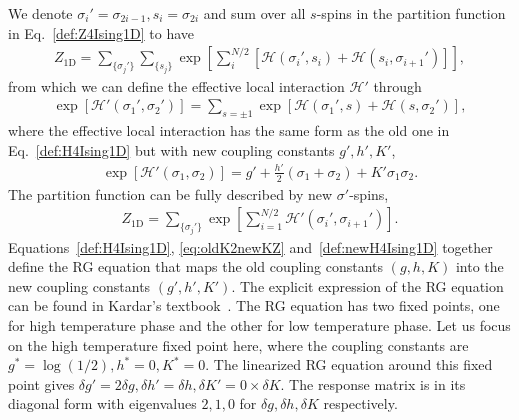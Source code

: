 \documentclass[aps,prb,reprint,superscriptaddress]{revtex4-2}
\begin{document}
We denote $\sigma_i'=\sigma_{2i-1}, s_i = \sigma_{2i}$ and sum over all
$s$-spins in the partition function in Eq.~\eqref{def:Z4Ising1D} to have
%
\begin{align}\label{eq:oldK2newKZ}
    Z_{\text{1D}} = \sum_{\{\sigma_j'\}} \sum_{\{s_j \}}
    \exp{\left[ \sum_i^{N/2} \left[\mathscr{H}\left(\sigma_i',s_i\right)
    + \mathscr{H}\left(s_i,\sigma_{i+1}'\right)\right]\right]},
\end{align}
%
from which we can define the effective local interaction $\mathscr{H}'$
through
%
\begin{align}\label{eq:oldK2newK}
    \exp{\left[\mathscr{H}'\left(\sigma_1',\sigma_2'\right)\right]} =
    \sum_{s=\pm 1}\exp{\left[\mathscr{H}\left(\sigma_1',s\right) +
        \mathscr{H}\left(s,\sigma_2'\right)\right]},
\end{align}
%
where the effective local interaction has the same form as the old one
in Eq.~\eqref{def:H4Ising1D} but with new coupling constants $g',h',K'$,
%
\begin{align}\label{def:newH4Ising1D}
    \exp{\left[\mathscr{H}'\left(\sigma_1,\sigma_2\right)\right]} = g' +
    \frac{h'}{2}\left(\sigma_1 + \sigma_2\right) + K' \sigma_1 \sigma_2.
\end{align}
%
The partition function can be fully described by new $\sigma'$-spins,
%
\begin{align}\label{eq:Z2Ising1Dnew}
    Z_{\text{1D}} = \sum_{\{\sigma_j'\}}
    \exp{\left[\sum_{i=1}^{N/2}\mathscr{H}'\left(\sigma_i',\sigma_{i+1}'\right)\right]}.
\end{align}
%
Equations~\eqref{def:H4Ising1D}, \eqref{eq:oldK2newKZ}
and~\eqref{def:newH4Ising1D} together define the RG equation that maps
the old coupling constants $(g,h,K)$ into the new coupling constants
$(g',h',K')$. The explicit expression of the RG equation can be found in
Kardar's textbook~\cite{kardar2007}. The RG equation has two fixed
points, one for high temperature phase and the other for low temperature
phase. Let us focus on the high temperature fixed point here, where the
coupling constants are $g^* = \log\left(1/2\right),h^*=0,K^*=0$. The
linearized RG equation around this fixed point gives $\delta g' =
2\delta g, \delta h' = \delta h, \delta K' = 0\times \delta K$. The
response matrix is in its diagonal form with eigenvalues $2,1,0$ for
$\delta g,\delta h,\delta K$ respectively.
%
\end{document}
